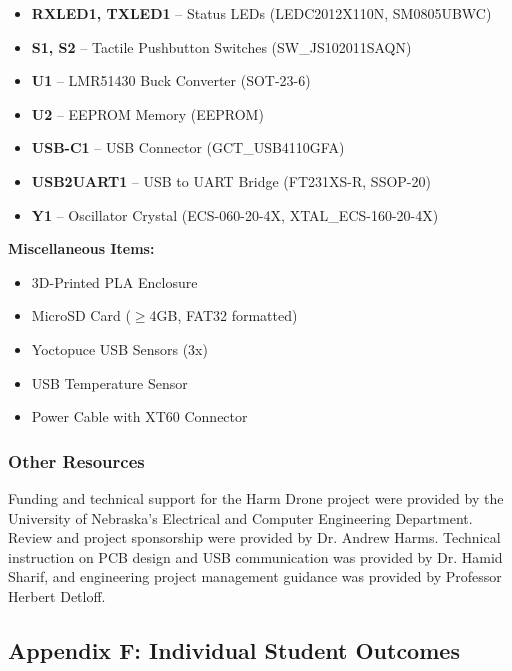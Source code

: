 \documentclass[12pt]{article}
\begin{document}
\begin{itemize}
    \item \textbf{RXLED1, TXLED1} – Status LEDs (LEDC2012X110N, SM0805UBWC)
    
    \item \textbf{S1, S2} – Tactile Pushbutton Switches (SW\_JS102011SAQN)
    
    \item \textbf{U1} – LMR51430 Buck Converter (SOT-23-6)
    \item \textbf{U2} – EEPROM Memory (EEPROM)
    
    \item \textbf{USB-C1} – USB Connector (GCT\_USB4110GFA)
    \item \textbf{USB2UART1} – USB to UART Bridge (FT231XS-R, SSOP-20)
    
    \item \textbf{Y1} – Oscillator Crystal (ECS-060-20-4X, XTAL\_ECS-160-20-4X)
\end{itemize}

\textbf{Miscellaneous Items:}
\begin{itemize}
    \item 3D-Printed PLA Enclosure
    \item MicroSD Card ($\ge$4GB, FAT32 formatted)
    \item Yoctopuce USB Sensors (3x)
    \item USB Temperature Sensor
    \item Power Cable with XT60 Connector
\end{itemize}


\subsubsection{Other Resources}

Funding and technical support for the Harm Drone project were provided by the University of Nebraska’s Electrical and Computer Engineering Department. Review and project sponsorship were provided by Dr. Andrew Harms. Technical instruction on PCB design and USB communication was provided by Dr. Hamid Sharif, and engineering project management guidance was provided by Professor Herbert Detloff.


\subsection{Appendix F: Individual Student Outcomes}




\end{document}

